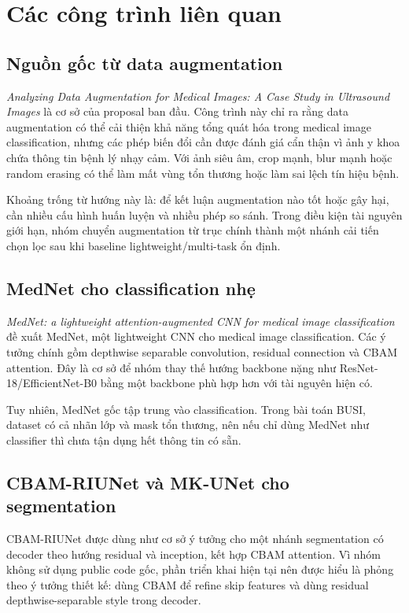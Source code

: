 \documentclass[12pt,a4paper]{article}
\begin{document}
\section{Các công trình liên quan}

\subsection{Nguồn gốc từ data augmentation}

\textit{Analyzing Data Augmentation for Medical Images: A Case Study in Ultrasound Images} là cơ sở của proposal ban đầu. Công trình này chỉ ra rằng data augmentation có thể cải thiện khả năng tổng quát hóa trong medical image classification, nhưng các phép biến đổi cần được đánh giá cẩn thận vì ảnh y khoa chứa thông tin bệnh lý nhạy cảm. Với ảnh siêu âm, crop mạnh, blur mạnh hoặc random erasing có thể làm mất vùng tổn thương hoặc làm sai lệch tín hiệu bệnh.

Khoảng trống từ hướng này là: để kết luận augmentation nào tốt hoặc gây hại, cần nhiều cấu hình huấn luyện và nhiều phép so sánh. Trong điều kiện tài nguyên giới hạn, nhóm chuyển augmentation từ trục chính thành một nhánh cải tiến chọn lọc sau khi baseline lightweight/multi-task ổn định.

\subsection{MedNet cho classification nhẹ}

\textit{MedNet: a lightweight attention-augmented CNN for medical image classification} đề xuất MedNet, một lightweight CNN cho medical image classification. Các ý tưởng chính gồm depthwise separable convolution, residual connection và CBAM attention. Đây là cơ sở để nhóm thay thế hướng backbone nặng như ResNet-18/EfficientNet-B0 bằng một backbone phù hợp hơn với tài nguyên hiện có.

Tuy nhiên, MedNet gốc tập trung vào classification. Trong bài toán BUSI, dataset có cả nhãn lớp và mask tổn thương, nên nếu chỉ dùng MedNet như classifier thì chưa tận dụng hết thông tin có sẵn.

\subsection{CBAM-RIUNet và MK-UNet cho segmentation}

CBAM-RIUNet được dùng như cơ sở ý tưởng cho một nhánh segmentation có decoder theo hướng residual và inception, kết hợp CBAM attention. Vì nhóm không sử dụng public code gốc, phần triển khai hiện tại nên được hiểu là phỏng theo ý tưởng thiết kế: dùng CBAM để refine skip features và dùng residual depthwise-separable style trong decoder.
\end{document}
